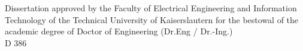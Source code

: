\begin{titlepage}%
%
%
%
%
%
%
\begin{center}%
%
\vspace*{0.05\textheight}\par%
%
%
\DenKrTPTitleAndSubtitle{\DenKrTPtitle}{\DenKrTPsubtitle}%
%
\vspace*{3\baselineskip}%
%
%
%
\vfill\vfill%
{%
\large {}\selectfont Dissertation approved by the Faculty of Electrical Engineering and Information Technology of the Technical University of Kaiserslautern for the bestowal of the academic degree of Doctor of Engineering (Dr.Eng / Dr.-Ing.)\\%
\vspace*{2ex}%
D 386%
}%
%

%
\end{center}%
\end{titlepage}%